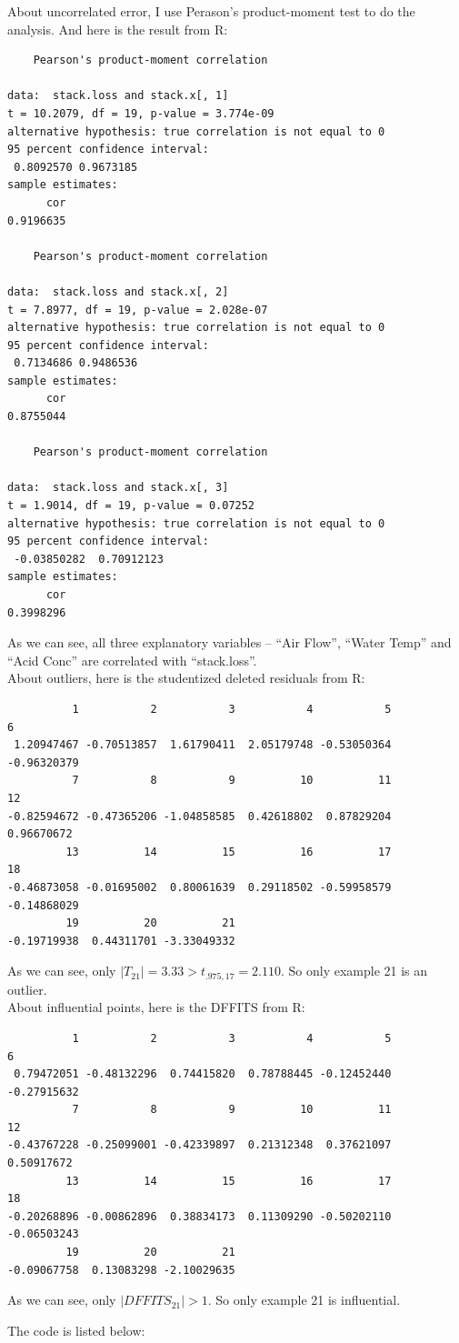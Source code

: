 \documentclass[12pt]{article}
\begin{document}
About uncorrelated error, I use Perason's product-moment test to do
the analysis. And here is the result from R:

\begin{verbatim}
	Pearson's product-moment correlation

data:  stack.loss and stack.x[, 1] 
t = 10.2079, df = 19, p-value = 3.774e-09
alternative hypothesis: true correlation is not equal to 0 
95 percent confidence interval:
 0.8092570 0.9673185 
sample estimates:
      cor 
0.9196635 

	Pearson's product-moment correlation

data:  stack.loss and stack.x[, 2] 
t = 7.8977, df = 19, p-value = 2.028e-07
alternative hypothesis: true correlation is not equal to 0 
95 percent confidence interval:
 0.7134686 0.9486536 
sample estimates:
      cor 
0.8755044 

	Pearson's product-moment correlation

data:  stack.loss and stack.x[, 3] 
t = 1.9014, df = 19, p-value = 0.07252
alternative hypothesis: true correlation is not equal to 0 
95 percent confidence interval:
 -0.03850282  0.70912123 
sample estimates:
      cor 
0.3998296 
\end{verbatim}

As we can see, all three explanatory variables -- ``Air Flow'',
``Water Temp'' and ``Acid Conc'' are correlated with ``stack.loss''.\\

About outliers, here is the studentized deleted residuals from R:

\begin{verbatim}
          1           2           3           4           5           6 
 1.20947467 -0.70513857  1.61790411  2.05179748 -0.53050364 -0.96320379 
          7           8           9          10          11          12 
-0.82594672 -0.47365206 -1.04858585  0.42618802  0.87829204  0.96670672 
         13          14          15          16          17          18 
-0.46873058 -0.01695002  0.80061639  0.29118502 -0.59958579 -0.14868029 
         19          20          21 
-0.19719938  0.44311701 -3.33049332
\end{verbatim}

As we can see, only $|T_{21}| = 3.33 > t_{.975, 17} = 2.110$. So only
example 21 is an outlier.\\

About influential points, here is the DFFITS from R:

\begin{verbatim}
          1           2           3           4           5           6 
 0.79472051 -0.48132296  0.74415820  0.78788445 -0.12452440 -0.27915632 
          7           8           9          10          11          12 
-0.43767228 -0.25099001 -0.42339897  0.21312348  0.37621097  0.50917672 
         13          14          15          16          17          18 
-0.20268896 -0.00862896  0.38834173  0.11309290 -0.50202110 -0.06503243 
         19          20          21 
-0.09067758  0.13083298 -2.10029635 
\end{verbatim}

As we can see, only $|DFFITS_{21}| > 1$. So only example 21 is influential.

\appendix
\appendixpage
\addappheadtotoc

The code is listed below:


\end{document}
